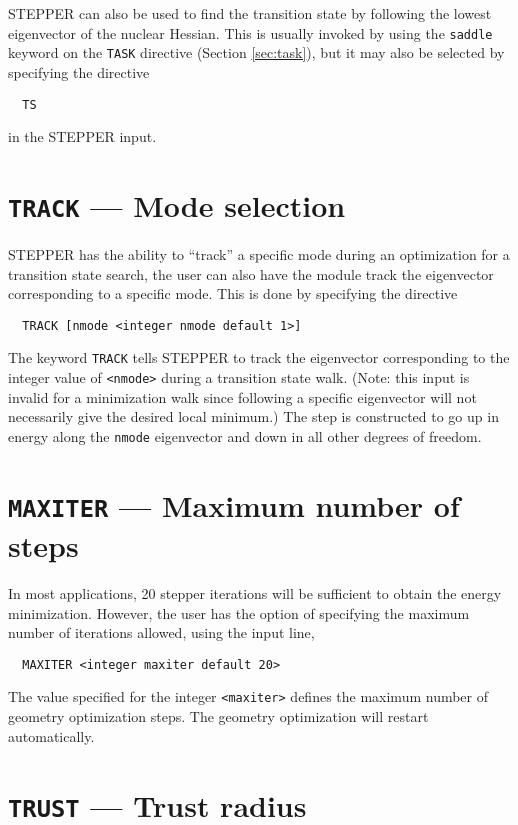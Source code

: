 STEPPER can also be used to find the transition state by following the
lowest eigenvector of the nuclear Hessian.  This is usually invoked 
by using the \verb+saddle+ keyword on the \verb+TASK+ directive
(Section \ref{sec:task}), but it may also be selected by specifying
the directive
\begin{verbatim}
  TS
\end{verbatim}
in the STEPPER input. 

\section{{\tt TRACK} --- Mode selection}

STEPPER has the ability to ``track'' a specific mode during an
optimization for a transition state search, the user can also have the
module track the eigenvector corresponding to a specific mode.  This
is done by specifying the directive 
\begin{verbatim}
  TRACK [nmode <integer nmode default 1>]
\end{verbatim}
The keyword \verb+TRACK+ tells STEPPER to track the eigenvector
corresponding to the integer value of \verb+<nmode>+ during a transition
state walk.  (Note: this input is invalid for a minimization walk
since following a specific eigenvector will not necessarily give the
desired local minimum.)  The step is constructed to go up in energy
along the \verb+nmode+ eigenvector and down in all other degrees of
freedom.

\section{{\tt MAXITER} --- Maximum number of steps}

In most applications, 20 stepper iterations will be sufficient to
obtain the energy minimization.  However, the user has the option of
specifying the maximum number of iterations allowed, using the input
line,
\begin{verbatim}
  MAXITER <integer maxiter default 20>
\end{verbatim}
The value specified for the integer \verb+<maxiter>+ defines the maximum
number of geometry optimization steps.  The geometry optimization will
restart automatically.

\section{{\tt TRUST} --- Trust radius}


